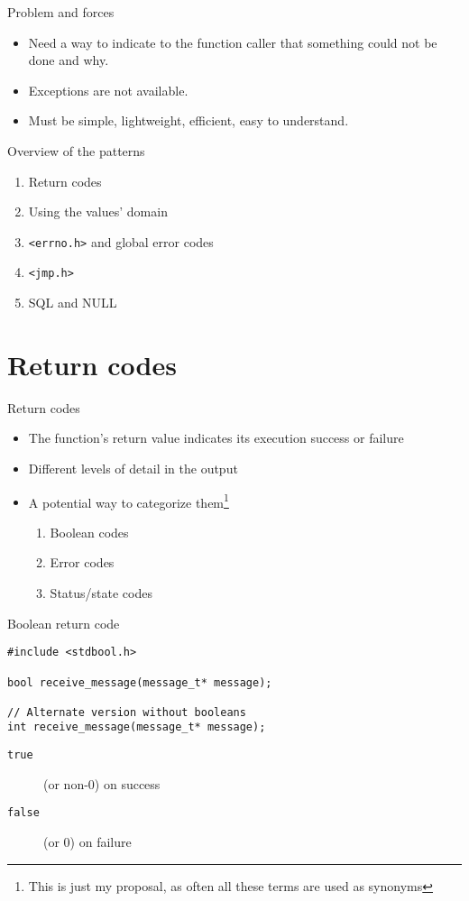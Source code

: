 \documentclass[aspectratio=169,14pt]{beamer}
\begin{document}
\begin{frame}{Problem and forces}
\begin{itemize}
    \item Need a way to indicate to the function caller that something could not be done and why.
    \item Exceptions are not available.
    \item Must be simple, lightweight, efficient, easy to understand.
\end{itemize}
\end{frame}

\begin{frame}{Overview of the patterns}
\begin{enumerate}
    \item Return codes
    \item Using the values' domain
    \item \texttt{<errno.h>} and global error codes
    \item \texttt{<jmp.h>}
    \item SQL and NULL
\end{enumerate}
\end{frame}


\section{Return codes}

\begin{frame}{Return codes}
\begin{itemize}
    \item The function's return value indicates its execution success or failure
    \item Different levels of detail in the output
    \item A potential way to categorize them\footnote{This is just my proposal, as often all these terms are used as synonyms}
    \begin{enumerate}
        \item Boolean codes
        \item Error codes
        \item Status/state codes
    \end{enumerate}
\end{itemize}
\end{frame}

\begin{frame}[fragile]{Boolean return code}
\begin{lstlisting}[style=cstyle]
#include <stdbool.h>

bool receive_message(message_t* message);

// Alternate version without booleans
int receive_message(message_t* message);
\end{lstlisting}

\begin{description}
    \item[\texttt{true}] (or non-0) on success
    \item[\texttt{false}] (or 0) on failure
\end{description}
\end{frame}
\end{document}
